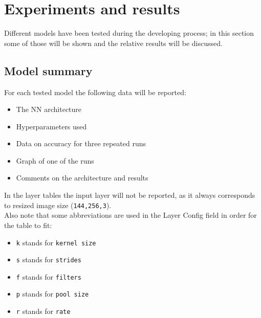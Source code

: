 \documentclass[a4paper,12pt]{article}
\begin{document}
\newpage
\section{Experiments and results}
Different models have been tested during the developing process; in this section some of those will be shown and the relative results will be discussed.
\subsection{Model summary}
For each tested model the following data will be reported:
\begin{itemize}
\item The NN architecture
\item Hyperparameters used
\item Data on accuracy for three repeated runs
\item Graph of one of the runs
\item Comments on the architecture and results
\end{itemize}
In the layer tables the input  layer will not be reported, as it always corresponds to resized image size (\texttt{144,256,3}).\\
Also note that some abbreviations are used in the Layer Config field in order for the table to fit:
\begin{itemize}
\item \texttt{k} stands for \texttt{kernel size}
\item \texttt{s} stands for \texttt{strides}
\item \texttt{f} stands for \texttt{filters}
\item \texttt{p} stands for \texttt{pool size}
\item \texttt{r} stands for \texttt{rate}
\end{itemize}

\newcommand{\conv}{Convolution(\texttt{Conv2d})}
\newcommand{\convP}[3]{\texttt{k=#1, s=#2, f=#3}}
\newcommand{\convKSF}[3]{\convP{#1}{#2}{#3}}

\newcommand{\flt}{Flatten(\texttt{Flatten})}

\newcommand{\dns}{Dense(\texttt{Dense})}
\newcommand{\dnsP}[1]{\texttt{u=#1}}

\newcommand{\pool}{MaxPooling(\texttt{MaxPooling2D})}
\newcommand{\poolN}{\texttt{p=2x2}}

\newcommand{\drop}{Dropout(\texttt{Dropout})}
\newcommand{\dropR}[1]{\texttt{r=#1}}
\end{document}
